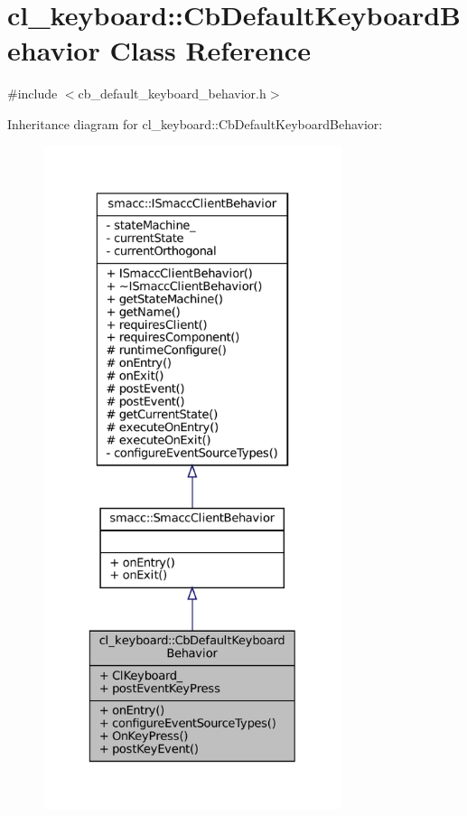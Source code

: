 \hypertarget{classcl__keyboard_1_1CbDefaultKeyboardBehavior}{}\section{cl\+\_\+keyboard\+:\+:Cb\+Default\+Keyboard\+Behavior Class Reference}
\label{classcl__keyboard_1_1CbDefaultKeyboardBehavior}


{\ttfamily \#include $<$cb\+\_\+default\+\_\+keyboard\+\_\+behavior.\+h$>$}



Inheritance diagram for cl\+\_\+keyboard\+:\+:Cb\+Default\+Keyboard\+Behavior\+:
\nopagebreak
\begin{figure}[H]
\begin{center}
\leavevmode
\includegraphics[height=550pt]{classcl__keyboard_1_1CbDefaultKeyboardBehavior__inherit__graph}
\end{center}
\end{figure}



